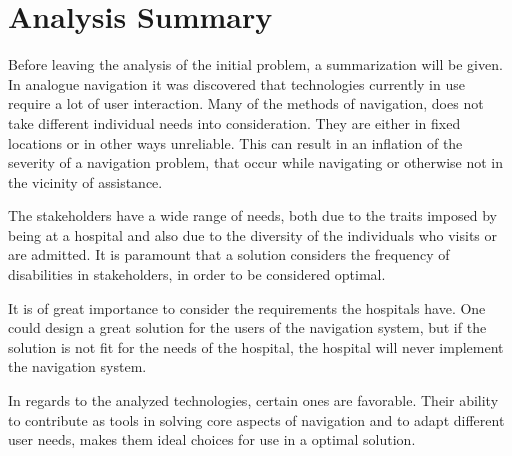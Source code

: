 \section{Analysis Summary} \label{analsum}
Before leaving the analysis of the initial problem, a summarization will be given. In analogue navigation it was discovered that technologies currently in use require a lot of user interaction. Many of the methods of navigation, does not take different individual needs into consideration. They are either in fixed locations or in other ways unreliable. This can result in an inflation of the severity of a navigation problem, that occur while navigating or otherwise not in the vicinity of assistance. 

The stakeholders have a wide range of needs, both due to the traits imposed by being at a hospital and also due to the diversity of the individuals who visits or are admitted. It is paramount that a solution considers the frequency of disabilities in stakeholders, in order to be considered optimal.

It is of great importance to consider the requirements the hospitals have. One could design a great solution for the users of the navigation system, but if the solution is not fit for the needs of the hospital, the hospital will never implement the navigation system.

In regards to the analyzed technologies, certain ones are favorable. Their ability to contribute as tools in solving core aspects of navigation and to adapt different user needs, makes them ideal choices for use in a optimal solution.